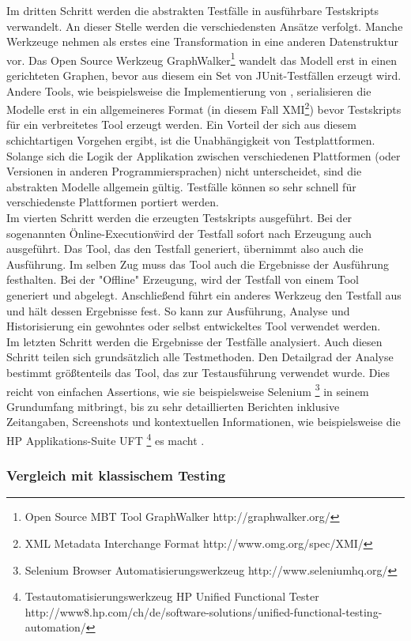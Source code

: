 Im dritten Schritt werden die abstrakten Testfälle in ausführbare Testskripts verwandelt. An dieser Stelle werden die verschiedensten Ansätze verfolgt. Manche Werkzeuge nehmen als erstes eine Transformation in eine anderen Datenstruktur vor. Das Open Source Werkzeug GraphWalker\footnote{Open Source MBT Tool GraphWalker http://graphwalker.org/} wandelt das Modell erst in einen gerichteten Graphen, bevor aus diesem ein Set von JUnit-Testfällen erzeugt wird. Andere Tools, wie beispielsweise die Implementierung von \cite{pinheiro_model-based_2013}, serialisieren die Modelle erst in ein allgemeineres Format (in diesem Fall XMI\footnote{XML Metadata Interchange Format http://www.omg.org/spec/XMI/}) bevor Testskripts für ein verbreitetes Tool erzeugt werden. Ein Vorteil der sich aus diesem schichtartigen Vorgehen ergibt, ist die Unabhängigkeit von Testplattformen. Solange sich die Logik der Applikation zwischen verschiedenen Plattformen (oder Versionen in anderen Programmiersprachen) nicht unterscheidet, sind die abstrakten Modelle allgemein gültig. Testfälle können so sehr schnell für verschiedenste Plattformen portiert werden.\\
Im vierten Schritt werden die erzeugten Testskripts ausgeführt. Bei der sogenannten \"Online-Execution\" wird der Testfall sofort nach Erzeugung auch ausgeführt. Das Tool, das den Testfall generiert, übernimmt also auch die Ausführung. Im selben Zug muss das Tool auch die Ergebnisse der Ausführung festhalten. Bei der "Offline" Erzeugung, wird der Testfall von einem Tool generiert und abgelegt. Anschließend führt ein anderes Werkzeug den Testfall aus und hält dessen Ergebnisse fest. So kann zur Ausführung, Analyse und Historisierung ein gewohntes oder selbst entwickeltes Tool verwendet werden.\\
Im letzten Schritt werden die Ergebnisse der Testfälle analysiert. Auch diesen Schritt teilen sich grundsätzlich alle Testmethoden. Den Detailgrad der Analyse bestimmt größtenteils das Tool, das zur Testausführung verwendet wurde. Dies reicht von einfachen Assertions, wie sie beispielsweise Selenium \footnote{Selenium Browser Automatisierungswerkzeug http://www.seleniumhq.org/} in seinem Grundumfang mitbringt, bis zu sehr detaillierten Berichten inklusive Zeitangaben, Screenshots und kontextuellen Informationen, wie beispielsweise die HP Applikations-Suite UFT \footnote{Testautomatisierungswerkzeug HP Unified Functional Tester http://www8.hp.com/ch/de/software-solutions/unified-functional-testing-automation/} es macht .


\subsubsection{Vergleich mit klassischem Testing}

